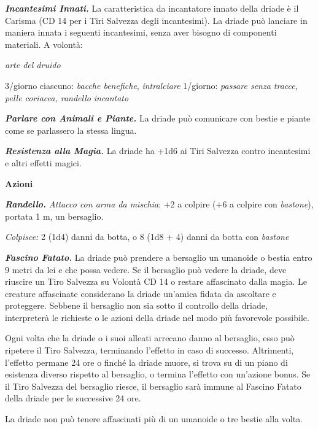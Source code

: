 \begin{multicols}{2}
\emph{\textbf{Incantesimi Innati.}} La caratteristica da incantatore innato della driade è il Carisma (CD 14 per i Tiri Salvezza degli incantesimi). La driade può lanciare in maniera innata i seguenti incantesimi, senza aver bisogno di componenti materiali. A volontà: 

\emph{arte del druido}

3/giorno ciascuno: \emph{bacche benefiche}, \emph{intralciare} 1/giorno:
\emph{passare senza tracce, pelle coriacea, randello} \emph{incantato}

\emph{\textbf{Parlare con Animali e Piante.}} La driade può comunicare con bestie e piante come se parlassero la stessa lingua.

\emph{\textbf{Resistenza alla Magia.}} La driade ha +1d6 ai Tiri Salvezza contro incantesimi e altri effetti magici.

\textbf{Azioni}

\emph{\textbf{Randello.} Attacco con arma da mischia}: +2 a colpire (+6 a colpire con \emph{bastone}), portata 1 m, un bersaglio.

\emph{Colpisce:} 2 (1d4) danni da botta, o 8 (1d8 + 4) danni da botta con \emph{bastone}

\emph{\textbf{Fascino Fatato.}} La driade può prendere a bersaglio un umanoide o bestia entro 9 metri da lei e che possa vedere. Se il bersaglio può vedere la driade, deve riuscire un Tiro Salvezza su Volontà CD 14 o restare affascinato dalla magia. Le creature affascinate considerano la driade un'amica fidata da ascoltare e proteggere. Sebbene il bersaglio non sia sotto il controllo della driade, interpreterà le richieste o le azioni della driade nel modo più favorevole possibile.

Ogni volta che la driade o i suoi alleati arrecano danno al bersaglio, esso può ripetere il Tiro Salvezza, terminando l'effetto in caso di successo. Altrimenti, l'effetto permane 24 ore o finché la driade muore, si trova su di un piano di esistenza diverso rispetto al bersaglio, o termina l'effetto con un'azione bonus. Se il Tiro Salvezza del bersaglio riesce, il bersaglio sarà immune al Fascino Fatato della driade per le successive 24 ore.

La driade non può tenere affascinati più di un umanoide o tre bestie alla volta.


\end{multicols}
